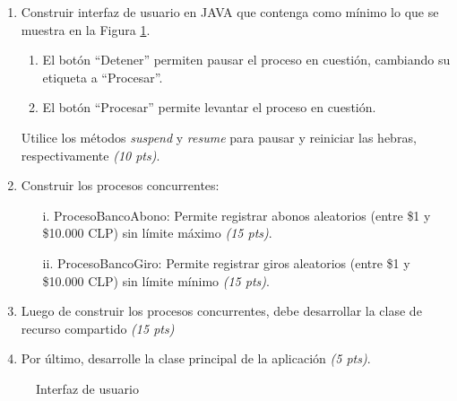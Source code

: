 \documentclass[10pt]{article}
\begin{document}
\begin{enumerate}
    \begin{enumerate}[label=(\alph*)]
		\item Construir interfaz de usuario en JAVA que contenga como m\'inimo lo que se muestra en la Figura \ref{fig:graf-user-mt}. 
        \begin{enumerate}
		\item El bot\'on ``Detener'' permiten pausar el proceso en cuesti\'on, cambiando su etiqueta a ``Procesar''. 
		\item El bot\'on ``Procesar'' permite levantar el proceso en cuesti\'on. 
		\end{enumerate}
		Utilice los m\'etodos \emph{suspend} y \emph{resume} para pausar y reiniciar las hebras, respectivamente \emph{(10 pts)}.
		\item Construir los procesos concurrentes:
		\begin{enumerate}[label=(\alph*)]
			\item[i.] ProcesoBancoAbono: Permite registrar abonos aleatorios (entre \$1 y \$10.000 CLP) sin l\'imite m\'aximo \emph{(15 pts)}.
			\item[ii.] ProcesoBancoGiro: Permite registrar giros aleatorios (entre \$1 y \$10.000 CLP) sin l\'imite m\'inimo \emph{(15 pts)}.
		\end{enumerate}
		\item Luego de construir los procesos concurrentes, debe desarrollar la clase de recurso compartido \emph{(15 pts)}
		\item Por \'ultimo, desarrolle la clase principal de la aplicaci\'on \emph{(5 pts)}.
	\end{enumerate}

	\begin{figure}[h]
        \begin{center}
            \caption{Interfaz de usuario}\label{fig:graf-user-mt}
        \end{center}
    \end{figure}
	\end{enumerate}
\end{document}

